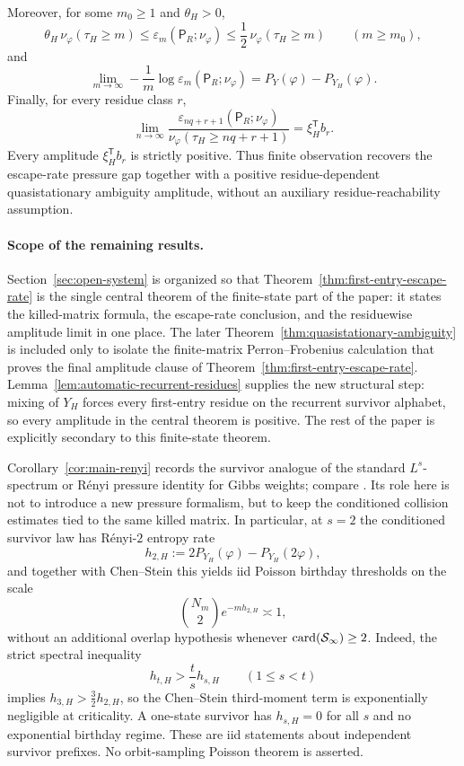 \begin{theorem}
\[\]
Moreover, for some \(m_0\geq1\) and \(\theta_H>0\),
\[
  \theta_H\,\nu_\varphi(\tau_H\ge m)
  \leq \varepsilon_m(\mathsf P_R;\nu_\varphi)
  \leq \frac12\,\nu_\varphi(\tau_H\ge m)
  \qquad(m\geq m_0),
\]
and
\[
  \lim_{m\to\infty}
  -\frac1m\log\varepsilon_m(\mathsf P_R;\nu_\varphi)
  =
  P_Y(\varphi)-P_{Y_H}(\varphi).
\]
Finally, for every residue class \(r\),
\[
  \lim_{n\to\infty}
  \frac{\varepsilon_{nq+r+1}(\mathsf P_R;\nu_\varphi)}
       {\nu_\varphi(\tau_H\ge nq+r+1)}
  = \xi_H^{\mathsf T}b_r.
\]
Every amplitude \(\xi_H^{\mathsf T}b_r\) is strictly positive.
Thus finite observation recovers the escape-rate pressure gap together
with a positive residue-dependent quasistationary ambiguity amplitude,
without an auxiliary residue-reachability assumption.
\end{theorem}

\paragraph{Scope of the remaining results.}
Section~\ref{sec:open-system} is organized so that
Theorem~\ref{thm:first-entry-escape-rate} is the single central theorem
of the finite-state part of the paper: it states the killed-matrix
formula, the escape-rate conclusion, and the residuewise amplitude
limit in one place.  The later
Theorem~\ref{thm:quasistationary-ambiguity} is included only to isolate
the finite-matrix Perron--Frobenius calculation that proves the final
amplitude clause of Theorem~\ref{thm:first-entry-escape-rate}.
Lemma~\ref{lem:automatic-recurrent-residues} supplies the new structural
step: mixing of \(Y_H\) forces every first-entry residue on the recurrent
survivor alphabet, so every amplitude in the central theorem is
positive.  The rest of the paper is explicitly secondary to this
finite-state theorem.

Corollary~\ref{cor:main-renyi} records the survivor analogue of the
standard \(L^s\)-spectrum or R\'enyi pressure identity for Gibbs weights;
compare \citet{Renyi1961,HentschelProcaccia1983,Pesin1997}.  Its role
here is not to introduce a new pressure formalism, but to keep the
conditioned collision estimates tied to the same killed matrix.  In
particular, at \(s=2\) the conditioned survivor law has R\'enyi-\(2\)
entropy rate
\[
  h_{2,H}:=2P_{Y_H}(\varphi)-P_{Y_H}(2\varphi),
\]
and together with Chen--Stein this yields iid Poisson birthday
thresholds on the scale
\[
  \binom{N_m}{2}e^{-m h_{2,H}}\asymp 1,
\]
without an additional overlap hypothesis whenever
\(\operatorname{card}(\mathcal S_\infty)\geq2\).  Indeed, the strict spectral inequality
\[
  h_{t,H}>\frac{t}{s}h_{s,H}\qquad(1\leq s<t)
\]
implies \(h_{3,H}>\frac32h_{2,H}\), so the Chen--Stein third-moment
term is exponentially negligible at criticality.  A one-state survivor
has \(h_{s,H}=0\) for all \(s\) and no exponential birthday regime.
These are iid statements about independent survivor prefixes.
No orbit-sampling Poisson theorem is asserted.

